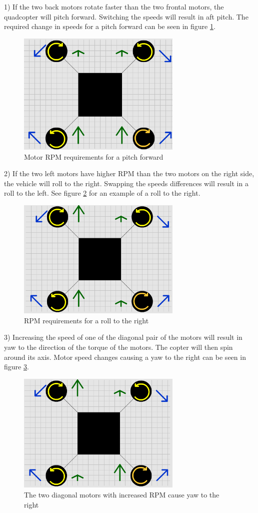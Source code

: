 1) If the two back motors rotate faster than the two frontal motors, the quadcopter will pitch forward. Switching the speeds will result in aft pitch. The required change in speeds for a pitch forward can be seen in figure \ref{dronePitch}.
\begin{figure}[H]
  \centering
    \includegraphics[width=0.7\textwidth]{images/dronePitch.png}
	\caption{Motor RPM requirements for a pitch forward}
	\label{dronePitch}
\end{figure}
2) If the two left motors have higher RPM than the two motors on the right side, the vehicle will roll to the right. Swapping the speeds differences will result in a roll to the left. See figure \ref{droneRoll} for an example of a roll to the right.
\begin{figure}[H]
  \centering
    \includegraphics[width=0.7\textwidth]{images/droneRoll.png}
	\caption{RPM requirements for a roll to the right}
	\label{droneRoll}
\end{figure}
3) Increasing the speed of one of the diagonal pair of the motors will result in yaw to the direction of the torque of the motors. The copter will then spin around its axis. Motor speed changes causing a yaw to the right can be seen in figure \ref{droneYaw}.
\begin{figure}[H]
  \centering
    \includegraphics[width=0.7\textwidth]{images/droneYaw.png}
	\caption{The two diagonal motors with increased RPM cause yaw to the right}
	\label{droneYaw}
\end{figure}
